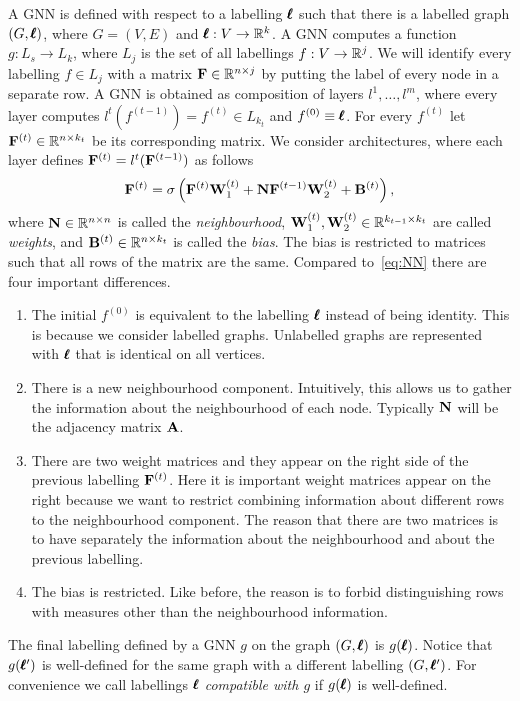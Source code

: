 A GNN is defined with respect to a labelling $\pmb{\ell}$ such that there is a labelled graph $(G,\pmb{\ell})$, where $G = (V,E)$ and $\pmb{\ell} : V \to \mathbb{R}^{k}$. A GNN computes a function $g : L_s \to L_k$, where $L_j$ is the set of all labellings $f : V \to \mathbb{R}^j$.
We will identify every labelling $f \in L_j$ with a matrix $\mathbf{F} \in \mathbb{R}^{n \times j}$ by putting the label of every node in a separate row.
A GNN is obtained as composition of layers $l^1, \ldots, l^m$, where every layer computes $l^t(f^{(t-1)}) = f^{(t)} \in L_{k_t}$ and $f^{(0)} \equiv \pmb{\ell}$. For every $f^{(t)}$ let $\mathbf{F}^{(t)} \in \mathbb{R}^{n \times k_{t}}$ be its corresponding matrix. We consider architectures, where each layer defines $\mathbf{F}^{(t)} = l^t(\mathbf{F}^{(t-1)})$ as follows
\begin{equation}\label{eq:GNNs}
\mathbf{F}^{(t)} = \sigma \left( \mathbf{F}^{(t)}\mathbf{W}_1^{(t)} + \mathbf{N}\mathbf{F}^{(t-1)}\mathbf{W}_2^{(t)} + \mathbf{B}^{(t)} \right),
\end{equation}
where $\mathbf{N} \in \mathbb{R}^{n \times n}$ is called the \emph{neighbourhood}, $\mathbf{W}_1^{(t)}, \mathbf{W}_2^{(t)} \in \mathbb{R}^{k_{t-1} \times k_t}$ are called \emph{weights}, and $\mathbf{B}^{(t)} \in \mathbb{R}^{n \times k_t}$ is called the \emph{bias}. The bias is restricted to matrices such that all rows of the matrix are the same. Compared to~\eqref{eq:NN} there are four important differences.
\begin{enumerate}
\item The initial $f^{(0)}$ is equivalent to the labelling $\pmb{\ell}$ instead of being identity. This is because we consider labelled graphs. Unlabelled graphs are represented with $\pmb{\ell}$ that is identical on all vertices.
 \item There is a new neighbourhood component. Intuitively, this allows us to gather the information about the neighbourhood of each node. Typically $\mathbf{N}$ will be the adjacency matrix $\mathbf{A}$.
 \item There are two weight matrices and they appear on the right side of the previous labelling $\mathbf{F}^{(t)}$. Here it is important weight matrices appear on the right because we want to restrict combining information about different rows to the neighbourhood component. The reason that there are two matrices is to have separately the information about the neighbourhood and about the previous labelling.
 \item The bias is restricted. Like before, the reason is to forbid distinguishing rows with measures other than the neighbourhood information.
\end{enumerate}
The final labelling defined by a GNN $g$ on the graph $(G,\pmb{\ell})$ is $g(\pmb{\ell})$. Notice that $g(\pmb{\ell}')$ is well-defined for the same graph with a different labelling $(G,\pmb{\ell}')$. For convenience we call labellings $\pmb{\ell}$ \emph{compatible with $g$} if $g(\pmb{\ell})$ is well-defined.

